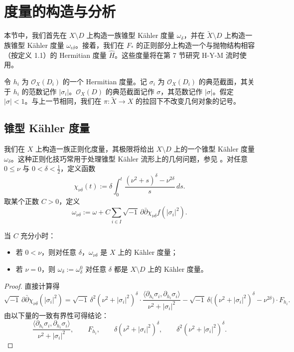 \chapter{度量的构造与分析}

本节中，我们首先在 \(X\setminus D\) 上构造一族锥型 Kähler 度量 \(\omega_\delta\)，并在 \(\widetilde X\setminus D\) 上构造一族锥型 Kähler 度量 \(\omega_{\epsilon\delta}\)。接着，我们在 \(F_*\) 的正则部分上构造一个与抛物结构相容（按定义 1.1）的 Hermitian 度量 \(\widehat{H}\)。这些度量将在第 7 节研究 H-Y-M 流时使用。

令 \(h_i\) 为 \( \mathcal O_X(D_i)\) 的一个 Hermitian 度量。记 \(\sigma_i\) 为 \( \mathcal O_X(D_i)\) 的典范截面，其关于 \(h_i\) 的范数记作 \(|\sigma_i|\)。\( \mathcal O_X(D)\) 的典范截面记作 \(\sigma\)，其范数记作 \(|\sigma|\)。假定 \(|\sigma|<1\)。与上一节相同，我们在 \(\pi:\widetilde X\to X\) 的拉回下不改变几何对象的记号。

\section{锥型 Kähler 度量}

我们在 \(X\) 上构造一族正则化度量，其极限将给出 \(X\setminus D\) 上的一个锥型 Kähler 度量 \(\omega_\delta\)。这种正则化技巧常用于处理锥型 Kähler 流形上的几何问题，参见 \cite{Ga-Hi-Pn-Mi}。对任意 \(0\le \nu\) 与 \(0<\delta<\frac12\)，定义函数
\[
\chi_{\nu\delta}(t):=
\delta\int_0^t \frac{(\nu^2+s)^\delta-\nu^{2\delta}}{s}\,ds.
\]
取某个正数 \(C>0\)，定义
\[
\omega_{\nu\delta}
:=
\omega
+
C\sum_{i\in I}\sqrt{-1}\,\partial\bar\partial \chi_{\nu\delta}f(|\sigma_i|^2).
\]

\begin{proposition}
当 \(C\) 充分小时：
\begin{itemize}
\item 若 \(0<\nu\)，则对任意 \(\delta\)，\(\omega_{\nu\delta}\) 是 \(X\) 上的 Kähler 度量；
\item 若 \(\nu=0\)，则 \(\omega_\delta:=\omega^0_\delta\) 对任意 \(\delta\) 都是 \(X\setminus D\) 上的 Kähler 度量。
\end{itemize}
\end{proposition}

\begin{proof}
直接计算得
\[
\sqrt{-1}\,\partial\bar\partial \chi_{\nu\delta}(|\sigma_i|^2)
=
\sqrt{-1}\,\delta^2(\nu^2+|\sigma_i|^2)^\delta\cdot
\frac{\langle \partial_{h_i}\sigma_i,\partial_{h_i}\sigma_i\rangle}{\nu^2+|\sigma_i|^2}
-
\sqrt{-1}\,\delta\bigl((\nu^2+|\sigma_i|^2)^\delta-\nu^{2\delta}\bigr)\cdot F_{h_i}.
\]
由以下量的一致有界性可得结论：
\[
\frac{\langle \partial_{h_i}\sigma_i,\partial_{h_i}\sigma_i\rangle}{\nu^2+|\sigma_i|^2},
\qquad
F_{h_i},
\qquad
\delta(\nu^2+|\sigma_i|^2)^\delta,
\qquad
\delta^2(\nu^2+|\sigma_i|^2)^\delta.
\]
\end{proof}

